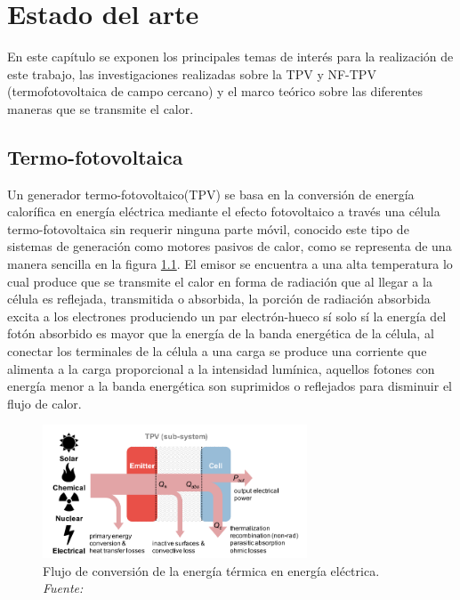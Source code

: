 \chapter{Estado del arte}
En este capítulo se exponen los principales temas de interés para la realización de este trabajo, las investigaciones realizadas sobre la TPV y NF-TPV (termofotovoltaica de campo cercano) y el marco teórico sobre las diferentes maneras que se transmite el calor.

\section{Termo-fotovoltaica}
Un generador termo-fotovoltaico(TPV) se basa en la conversión de energía calorífica en energía eléctrica mediante el efecto fotovoltaico a través una célula termo-fotovoltaica sin requerir ninguna parte móvil, conocido este tipo de sistemas de generación como motores pasivos de calor, como se representa de una manera sencilla en la figura \ref{fig:TPV_Subsistema}. El emisor se encuentra a una alta temperatura lo cual produce que se transmite el calor en forma de radiación que al llegar a la célula es reflejada, transmitida o absorbida, la porción de radiación absorbida excita a los electrones produciendo un par electrón-hueco sí solo sí la energía del fotón absorbido es mayor que la energía de la banda energética de la célula, al conectar los terminales de la célula a una carga se produce una corriente que alimenta a la carga proporcional a la intensidad lumínica, aquellos fotones con energía menor a la banda energética son suprimidos o reflejados para disminuir el flujo de calor\cite{Present_Efficiencies_and_Future_Opportunities_in_Thermophotovoltaics}.\\

\begin{figure}[H]
	\centering
	\includegraphics[width=0.7\textwidth]{figuras/TPV_Subsistema.png}
	\caption{Flujo de conversión de la energía térmica en energía eléctrica. \textit{Fuente: \cite{Present_Efficiencies_and_Future_Opportunities_in_Thermophotovoltaics}}}
	\label{fig:TPV_Subsistema}
\end{figure}

